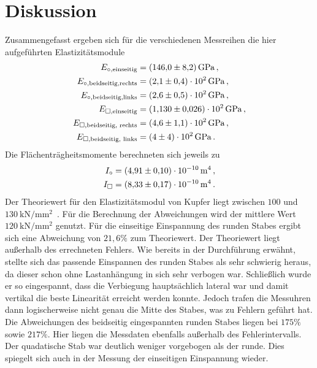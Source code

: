 \section{Diskussion}
\label{sec:Diskussion}
Zusammengefasst ergeben sich für die verschiedenen Messreihen die hier aufgeführten 
Elastizitätsmodule
\begin{align*}
    E_{\circ,\text{einseitig}}&=\qty{146(8,2)}{\giga\pascal}\,,\\
    E_{\circ,\text{beidseitig,rechts}}&=\qty{2.1(0.4)e2}{\giga\pascal}\,,\\
    E_{\circ,\text{beidseitig,links}}&=\qty{2.6(0.5)e2}{\giga\pascal}\,,\\
    E_{\square,\text{einseitig}}&=\qty{1,13(0.026)e2}{\giga\pascal}\,,\\
    E_{\square,\text{beidseitig, rechts}}&=\qty{4.6(1.1)e2}{\giga\pascal}\,,\\
    E_{\square,\text{beidseitig, links}}&=\qty{4(4)e2}{\giga\pascal}\,.\\
\end{align*}
Die Flächenträgheitsmomente berechneten sich jeweils zu 
\begin{align*}
    I_\circ&=\qty{4,91(0.10)e-10}{\meter\tothe{4}}\,,\\
    I_\square&=\qty{8,33(0,17)e-10}{\meter\tothe{4}}\,.
\end{align*}
Der Theoriewert für den Elastizitätsmodul von Kupfer liegt zwischen $100$ und $\qty{130}{\kilo\newton\per\milli\meter\squared}$\,
\cite{Elastizitätsmodul}.
Für die Berechnung der Abweichungen wird der mittlere Wert $\qty{120}{\kilo\newton\per\milli\meter\squared}$ genutzt.
Für die einseitige Einspannung des runden Stabes ergibt sich eine Abweichung von $21,6\%$ zum Theoriewert. Der Theoriewert liegt außerhalb 
des errechneten Fehlers. Wie bereits in der Durchführung erwähnt, stellte sich das passende Einspannen des runden Stabes als sehr schwierig
heraus, da dieser schon ohne Lastanhängung in sich sehr verbogen war. Schließlich wurde er so eingespannt, dass die Verbiegung hauptsächlich
lateral war und damit vertikal die beste Linearität erreicht werden konnte. Jedoch trafen die Messuhren dann logischerweise nicht genau die 
Mitte des Stabes, was zu Fehlern geführt hat.
Die Abweichungen des beidseitig eingespannten runden Stabes liegen bei $175\%$ sowie $217\%$. Hier liegen die Messdaten ebenfalls außerhalb des 
Fehlerintervalls.
Der quadatische Stab war deutlich weniger vorgebogen als der runde. Dies spiegelt sich auch in der Messung der einseitigen Einspannung wieder.

